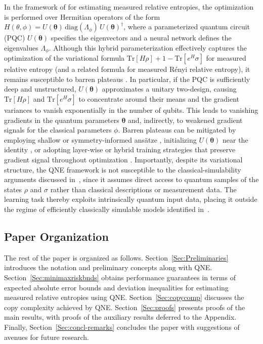 \documentclass[a4paper,onecolumn,11pt,accepted=2026-05-12]{quantumarticle}
\begin{document}
In the framework of \cite{QNE-24} for estimating measured relative entropies, the optimization is performed over Hermitian operators of the form $H(\theta,\phi) = U(\bm{\theta})\,\mathrm{diag}(\Lambda_\phi)\,U(\bm{\theta})^\dagger$, where a parameterized quantum circuit (PQC) $U(\bm{\theta})$ specifies the eigenvectors and a neural network defines the eigenvalues $\Lambda_\phi$. Although this hybrid parameterization effectively captures the optimization of the variational formula $\mathrm{Tr}[H\rho] + 1 - \mathrm{Tr}[e^{H}\sigma]$ for measured relative entropy (and a related formula for measured R\'enyi relative entropy), it remains susceptible to barren plateaus \cite{McClean_2018,Cerezo2021CostDependent,Holmes2022Trainability}. In particular, if the PQC is sufficiently deep and unstructured, $U(\bm{\theta})$ approximates a unitary two-design, causing $\mathrm{Tr}[H\rho]$ and $\mathrm{Tr}[e^{H}\sigma]$ to concentrate around their means and the gradient variances to vanish exponentially in the number of qubits. This leads to vanishing gradients in the quantum parameters $\bm{\theta}$ and, indirectly, to weakened gradient signals for the classical parameters $\phi$. Barren plateaus can be mitigated by employing shallow or symmetry-informed ansätze \cite{Meyer2023ExploitingSymmetry,Nguyen2024TheoryEquivariantQNN}, initializing $U(\bm{\theta})$ near the identity \cite{Grant2019Initialization}, or adopting layer-wise or hybrid training strategies that preserve gradient signal throughout optimization \cite{Skolik2021Layerwise}. Importantly, despite its variational structure, the QNE framework is not susceptible to the classical-simulability arguments discussed in~\cite{Cerezo2025ProvableAbsence}, since it assumes direct access to quantum samples of the states $\rho$ and $\sigma$ rather than classical descriptions or measurement data. The learning task thereby exploits intrinsically quantum input data, placing it outside the regime of efficiently classically simulable models identified in~\cite{Cerezo2025ProvableAbsence}.
\subsection*{Paper Organization}
The rest of the paper is organized as follows. Section~\ref{Sec:Preliminaries} introduces the notation and preliminary concepts along with QNE. Section~\ref{Sec:minimaxriskbnds} obtains performance guarantees in terms of expected absolute error bounds and  deviation inequalities for estimating measured relative entropies using QNE. Section~\ref{Sec:copycomp} discusses the copy complexity achieved by QNE. Section~\ref{Sec:proofs} presents proofs of the main results, with proofs of the auxiliary results deferred to the Appendix. Finally, Section~\ref{Sec:concl-remarks}  concludes the paper with suggestions of avenues for future research.  
\end{document}
